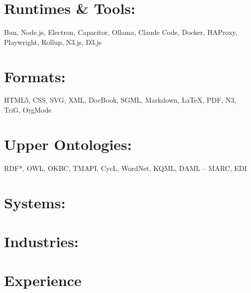 \documentclass[line,margin,hidelinks]{res}
\begin{document}
\section{Runtimes \& Tools:}
\begin{par}
  Bun, Node.js, Electron, Capacitor, Ollama, Claude Code,
  Docker, HAProxy, Playwright, Rollup, N3.js, D3.js
\end{par}

\section{Formats:}
\begin{par}
  \small{HTML5, CSS, SVG, XML, DocBook, SGML, Markdown, \LaTeX, PDF, N3, TriG, OrgMode}
\end{par}

\section{\footnotesize{Upper Ontologies:}}
\begin{par}
  RDF*, OWL, OKBC, TMAPI, CycL, WordNet, KQML, DAML -- MARC, EDI
\end{par}


% 


\section{Systems:}


\section{Industries:}



\section{Experience}
\end{document}
